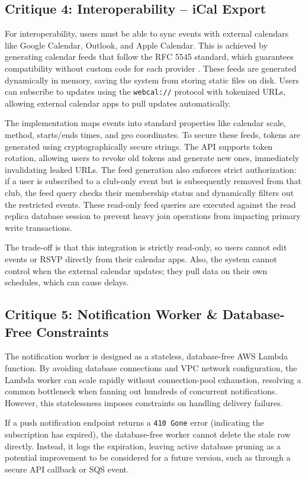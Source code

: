 \subsection{Critique 4: Interoperability -- iCal Export}
For interoperability, users must be able to sync events with external calendars like Google Calendar, Outlook, and Apple Calendar. This is achieved by generating calendar feeds that follow the RFC 5545 standard, which guarantees compatibility without custom code for each provider \cite{icalendar_resources}. These feeds are generated dynamically in memory, saving the system from storing static files on disk. Users can subscribe to updates using the \texttt{webcal://} protocol with tokenized URLs, allowing external calendar apps to pull updates automatically.

The implementation maps events into standard properties like calendar scale, method, starts/ends times, and geo coordinates. To secure these feeds, tokens are generated using cryptographically secure strings. The API supports token rotation, allowing users to revoke old tokens and generate new ones, immediately invalidating leaked URLs. The feed generation also enforces strict authorization: if a user is subscribed to a club-only event but is subsequently removed from that club, the feed query checks their membership status and dynamically filters out the restricted events. These read-only feed queries are executed against the read replica database session to prevent heavy join operations from impacting primary write transactions.

The trade-off is that this integration is strictly read-only, so users cannot edit events or RSVP directly from their calendar apps. Also, the system cannot control when the external calendar updates; they pull data on their own schedules, which can cause delays.

\subsection{Critique 5: Notification Worker \& Database-Free Constraints}
The notification worker is designed as a stateless, database-free AWS Lambda function. By avoiding database connections and VPC network configuration, the Lambda worker can scale rapidly without connection-pool exhaustion, resolving a common bottleneck when fanning out hundreds of concurrent notifications. However, this statelessness imposes constraints on handling delivery failures. 

If a push notification endpoint returns a \texttt{410 Gone} error (indicating the subscription has expired), the database-free worker cannot delete the stale row directly. Instead, it logs the expiration, leaving active database pruning as a potential improvement to be considered for a future version, such as through a secure API callback or SQS event. 

